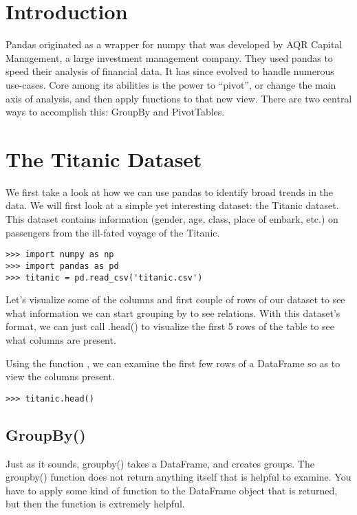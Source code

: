 \label{lab:pandas3}

\section*{Introduction}
Pandas originated as a wrapper for numpy that was developed by AQR Capital Management, a large investment management company. They used pandas to speed their analysis of financial data. It has since evolved to handle numerous use-cases. Core among its abilities is the power to ``pivot'', or change the main axis of analysis, and then apply functions to that new view. There are two central ways to accomplish this: GroupBy and PivotTables.

\section*{The Titanic Dataset}
We first take a look at how we can use pandas to identify broad trends in the data. We will first look at a simple yet interesting dataset: the Titanic dataset. This dataset contains information (gender, age, class, place of embark, etc.) on passengers from the ill-fated voyage of the Titanic.

\begin{lstlisting}
>>> import numpy as np
>>> import pandas as pd
>>> titanic = pd.read_csv('titanic.csv')
\end{lstlisting}

Let's visualize some of the columns and first couple of rows of our dataset to see what information we can start grouping by to see relations. With this dataset's format, we can just call .head() to visualize the first 5 rows of the table to see what columns are present.

Using the function , we can examine the first few rows of a DataFrame so as to view the columns present.

\begin{lstlisting}
>>> titanic.head()
\end{lstlisting}


\subsection*{GroupBy()}
Just as it sounds, groupby() takes a DataFrame, and creates groups. The groupby() function does not return anything itself that is helpful to examine. You have to apply some kind of function to the DataFrame object that is returned, but then the function is extremely helpful.

